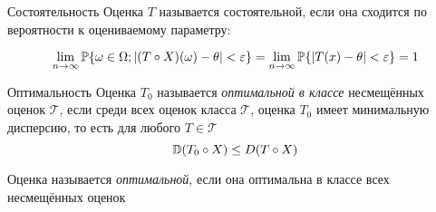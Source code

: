 \begin{dfn}{Состоятельность}
Оценка $T$ называется состоятельной,
если она сходится по вероятности к оцениваемому параметру:

$$\lim_{n\to\infty}
    \mathbb P\{\omega\in\Omega; \left|(T\circ X)(\omega) - \theta\right| < \varepsilon \}
= \lim_{n\to\infty}
    \mathbb P\{\left|T(x) - \theta\right| < \varepsilon\}
= 1$$
\end{dfn}

\begin{dfn}{Оптимальность}
Оценка $T_0$ называется \emph{оптимальной в классе} несмещённых оценок $\mathcal T$,
если среди всех оценок класса $\mathcal T$,
оценка $T_0$ имеет минимальную дисперсию,
то есть для любого $T\in\mathcal T$
$$\mathbb D(T_0\circ X) \leq D(T\circ X)$$

Оценка называется \emph{оптимальной},
если она оптимальна в классе всех несмещённых оценок
\end{dfn}
